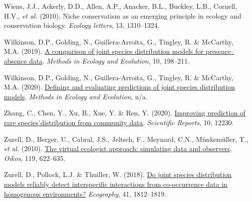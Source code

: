 \documentclass[9pt,biorxiv,doublespacing,lineno,endfloat]{lapreprint}
\newlength{\cslhangindent}
\newlength{\cslentryspacingunit} %
\newenvironment{CSLReferences}[2] %
 {%
  \setlength{\parindent}{0pt}
  \ifodd #1
  \let\oldpar\par
  \def\par{\hangindent=\cslhangindent\oldpar}
  \fi
  \setlength{\parskip}{#2\cslentryspacingunit}
 }%
 {}
\begin{document}
\begin{CSLReferences}{1}{0}
\leavevmode{}%
Wiens, J.J., Ackerly, D.D., Allen, A.P., Anacker, B.L., Buckley, L.B.,
Cornell, H.V., \emph{et al.} (2010). Niche conservatism as an emerging
principle in ecology and conservation biology. \emph{Ecology letters},
13, 1310--1324.

\leavevmode{}%
Wilkinson, D.P., Golding, N., Guillera-Arroita, G., Tingley, R. \&
McCarthy, M.A. (2019). \href{https://doi.org/10.1111/2041-210X.13106}{A
comparison of joint species distribution models for presence--absence
data}. \emph{Methods in Ecology and Evolution}, 10, 198--211.

\leavevmode{}%
Wilkinson, D.P., Golding, N., Guillera-Arroita, G., Tingley, R. \&
McCarthy, M.A. (2020).
\href{https://doi.org/10.1111/2041-210X.13518}{Defining and evaluating
predictions of joint species distribution models}. \emph{Methods in
Ecology and Evolution}, n/a.

\leavevmode{}%
Zhang, C., Chen, Y., Xu, B., Xue, Y. \& Ren, Y. (2020).
\href{https://doi.org/10.1038/s41598-020-69157-x}{Improving prediction
of rare species'distribution from community data}. \emph{Scientific
Reports}, 10, 12230.

\leavevmode{}%
Zurell, D., Berger, U., Cabral, J.S., Jeltsch, F., Meynard, C.N.,
Münkemüller, T., \emph{et al.} (2010).
\href{https://doi.org/10.1111/j.1600-0706.2009.18284.x}{The virtual
ecologist approach: simulating data and observers}. \emph{Oikos}, 119,
622--635.

\leavevmode{}%
Zurell, D., Pollock, L.J. \& Thuiller, W. (2018).
\href{https://doi.org/10.1111/ecog.03315}{Do joint species distribution
models reliably detect interspecific interactions from co-occurrence
data in homogenous environments?} \emph{Ecography}, 41, 1812--1819.

\end{CSLReferences}

\if@endfloat\clearpage\processdelayedfloats\clearpage\fi 






\end{document}
